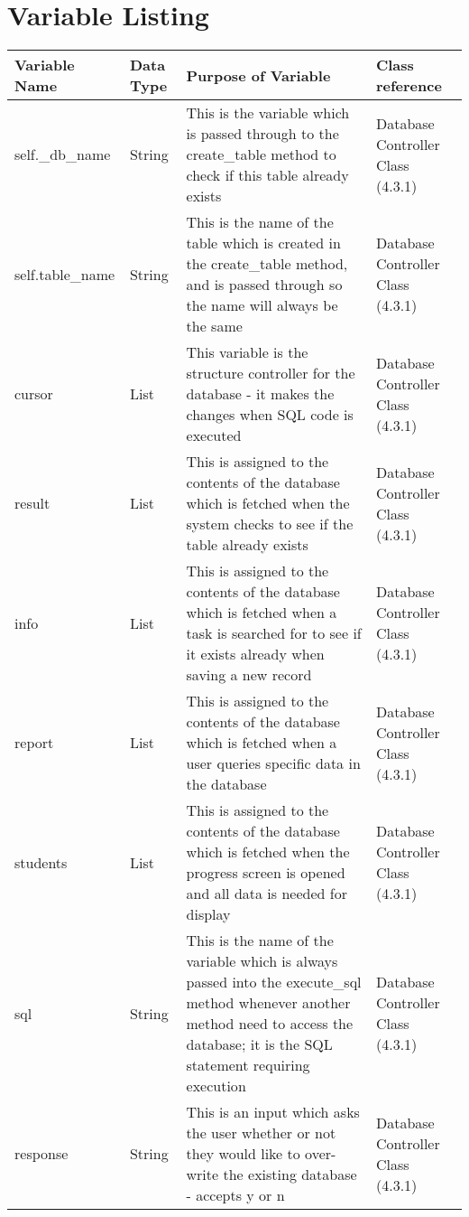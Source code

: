 \section{Variable Listing}

\begin{center}
\begin{longtable}{|p{3cm}|p{3cm}|p{4cm}|p{4cm}|} \hline
\textbf{Variable Name} & \textbf{Data Type} & \textbf{Purpose of Variable} & \textbf{Class reference} \\ \hline
self.\_db\_name & String & This is the variable which is passed through to the create\_table method to check if this table already exists & Database Controller Class (4.3.1) \\ \hline
self.table\_name & String & This is the name of the table which is created in the create\_table method, and is passed through so the name will always be the same & Database Controller Class (4.3.1) \\ \hline
cursor & List & This variable is the structure controller for the database - it makes the changes when SQL code is executed & Database Controller Class (4.3.1) \\ \hline
result & List & This is assigned to the contents of the database which is fetched when the system checks to see if the table already exists & Database Controller Class (4.3.1) \\ \hline
info & List & This is assigned to the contents of the database which is fetched when a task is searched for to see if it exists already when saving a new record & Database Controller Class (4.3.1) \\ \hline
report & List & This is assigned to the contents of the database which is fetched when a user queries specific data in the database & Database Controller Class (4.3.1) \\ \hline
students & List & This is assigned to the contents of the database which is fetched when the progress screen is opened and all data is needed for display & Database Controller Class (4.3.1) \\ \hline
sql & String & This is the name of the variable which is always passed into the execute\_sql method whenever another method need to access the database; it is the SQL statement requiring execution & Database Controller Class (4.3.1) \\ \hline
response & String & This is an input which asks the user whether or not they would like to over-write the existing database - accepts y or n & Database Controller Class (4.3.1) \\ \hline

\end{longtable}
\end{center}

